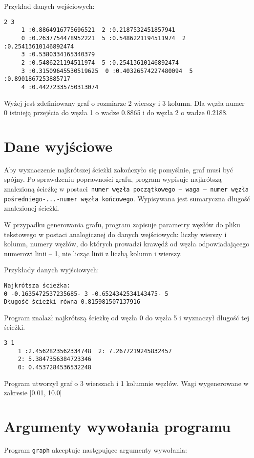 \documentclass[]{article}
\begin{document}
Przykład danych wejściowych:

\begin{verbatim}
2 3
	 1 :0.8864916775696521  2 :0.2187532451857941 
	 0 :0.2637754478952221  5 :0.5486221194511974  2 :0.25413610146892474
	 3 :0.5380334165340379
	 2 :0.5486221194511974  5 :0.25413610146892474
	 3 :0.31509645530519625  0 :0.40326574227480094  5 :0.8901867253885717
	 4 :0.44272335750313074
\end{verbatim}
Wyżej jest zdefiniowany graf o rozmiarze 2 wierszy i 3 kolumn. Dla węzła numer 0 istnieją przejścia do węzła 1 o wadze 0.8865 i do węzła 2 o wadze 0.2188.

\section{Dane wyjściowe}\label{header-n279}
Aby wyznaczenie najkrótszej ścieżki zakończyło się pomyślnie, graf musi być spójny. Po sprawdzeniu poprawności grafu, program wypisuje najkrótszą znalezioną ścieżkę w postaci\texttt{ numer węzła początkowego – waga – numer węzła pośredniego-...-numer węzła końcowego}. Wypisywana jest sumaryczna długość znalezionej ścieżki.

W przypadku generowania grafu, program zapisuje parametry węzłów do pliku tekstowego w postaci analogicznej do danych wejściowych: liczby wierszy i kolumn, numery węzłów, do których prowadzi krawędź od węzła odpowiadającego numerowi linii – 1, nie licząc linii z liczbą kolumn i wierszy.

Przykłady danych wyjściowych:

\begin{verbatim}
Najkrótsza ścieżka:
0 -0.1635472537235685- 3 -0.6524342534143475- 5
Długość ścieżki równa 0.815981507137916
\end{verbatim}
Program znalazł najkrótszą ścieżkę od węzła 0 do węzła 5 i wyznaczył długość tej ścieżki.

\begin{verbatim}
3 1
    1 :2.4562823562334748  2: 7.2677219245832457 
    2: 5.3847356384723346
    0: 0.4537284536532248
\end{verbatim}
Program utworzył graf o 3 wierszach i 1 kolumnie węzłów. Wagi wygenerowane w zakresie [0.01, 10.0]
\section{Argumenty wywołania programu}\label{header-n256}

Program \texttt{graph} akceptuje następujące argumenty wywołania:
\end{document}
